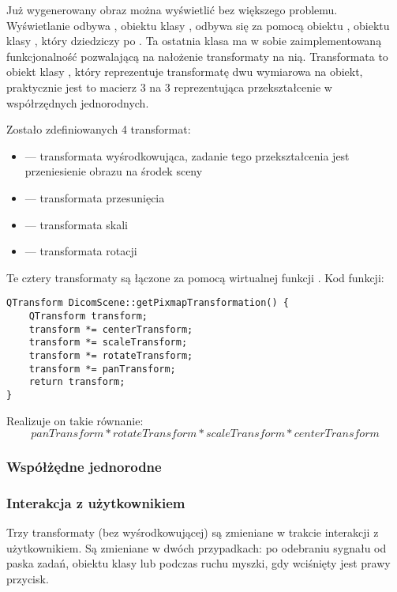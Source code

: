 \par
Już wygenerowany obraz można wyświetlić bez większego problemu.
Wyświetlanie odbywa , obiektu klasy , odbywa się za pomocą obiektu , obiektu klasy , który dziedziczy po .
Ta ostatnia klasa ma w sobie zaimplementowaną funkcjonalność pozwalającą na nałożenie transformaty na nią.
Transformata to obiekt klasy , który reprezentuje transformatę dwu wymiarowa na obiekt, praktycznie jest to macierz 3 na 3 reprezentująca przekształcenie w współrzędnych jednorodnych.
\par

Zostało zdefiniowanych 4 transformat:
\begin{itemize}
    \item {} --- transformata wyśrodkowująca, zadanie tego przekształcenia jest przeniesienie obrazu na środek sceny
    \item {} --- transformata przesunięcia
    \item {} --- transformata skali
    \item {} --- transformata rotacji
\end{itemize}

Te cztery transformaty są łączone za pomocą wirtualnej funkcji .
Kod funkcji:
\begin{lstlisting}
QTransform DicomScene::getPixmapTransformation() {
	QTransform transform;
	transform *= centerTransform;
	transform *= scaleTransform;
	transform *= rotateTransform;
	transform *= panTransform;
	return transform;
}
\end{lstlisting}
Realizuje on takie równanie:
\[panTransform*rotateTransform*scaleTransform*centerTransform\]


\subsubsection{Współżędne jednorodne}

\subsubsection{Interakcja z użytkownikiem}

Trzy transformaty (bez wyśrodkowującej) są zmieniane w trakcie interakcji z użytkownikiem.
Są zmieniane w dwóch przypadkach: po odebraniu sygnału od paska zadań, obiektu klasy  lub podczas ruchu myszki, gdy wciśnięty jest prawy przycisk.